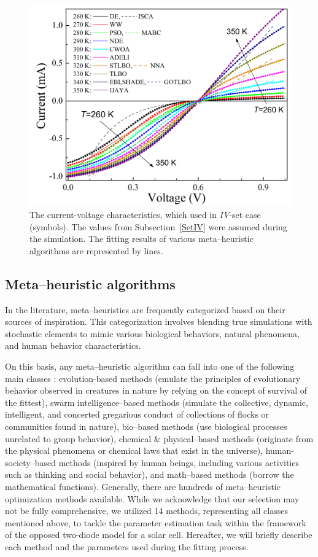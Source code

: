 \documentclass[a4paper,fleqn]{cas-sc}
\begin{document}
\begin{figure}[]
	\centering
		\includegraphics[width=0.5\columnwidth]{Fig3}
	  \caption{The current-voltage characteristics, which used in \emph{IV}-set case (symbols).
        The values from Subsection~\ref{SetIV} were assumed during the simulation.
        The fitting results of various meta--heuristic algorithms are represented by lines.}\label{figSetIV}
\end{figure}


\subsection{Meta--heuristic algorithms}\label{MHA}
In the literature, meta--heuristics are frequently categorized based on their sources of inspiration.
This categorization involves blending true simulations with stochastic elements
to mimic various biological behaviors, natural phenomena, and human behavior characteristics.

On this basis, any meta--heuristic algorithm can fall into one of the following main classes \cite{WhiteShark,Gannet,Dandelion}:
evolution-based methods (emulate the principles of evolutionary behavior observed in creatures in nature by relying on the concept of survival of the fittest),
swarm intelligence--based methods (simulate the collective, dynamic, intelligent, and concerted gregarious conduct of collections of flocks or communities found in nature),
bio--based methods (use biological processes unrelated to group behavior),
chemical \& physical--based methods (originate from the physical phenomena or chemical laws that exist in the universe),
human-society--based methods (inspired by human beings, including various activities such as thinking and social behavior),
and math--based methods (borrow the mathematical functions).
Generally, there are hundreds of meta--heuristic optimization methods available.
While we acknowledge that our selection may not be fully comprehensive,
we utilized 14 methods, representing all classes mentioned above,
to tackle the parameter estimation task within the framework of the opposed two-diode model for a solar cell.
Hereafter, we will briefly describe each method and the parameters used during the fitting process.
\end{document}
